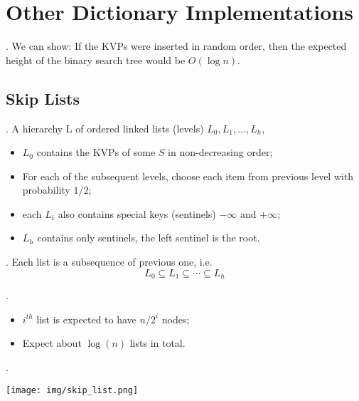 \documentclass{article}
\begin{document}
\newpage

\section{Other Dictionary Implementations} 

\begin{thmm}[].
    We can show: If the KVPs were inserted in random order, then the expected height of the binary search tree would be $O(\log n)$. 
\end{thmm}

\subsection{Skip Lists} 

\begin{deff}.
    A hierarchy L of ordered linked lists (levels) $L_0, L_1, \ldots, L_h$, 
    \begin{itemize}
        \item $L_0$ contains the KVPs of some $S$ in non-decreasing order; 
        \item For each of the subsequent levels, choose each item from previous level with probability $1/2$; 
        \item each $L_i$ also contains special keys (sentinels) $- \infty$ and $+ \infty$; 
        \item $L_h$ contains only sentinels, the left sentinel is the root.
    \end{itemize}
\end{deff}

\begin{discovery}[].
    Each list is a subsequence of previous one, i.e. 
    \[ L_0 \subseteq L_1 \subseteq \cdots \subseteq L_h \]
\end{discovery}

\begin{discovery}[].
    \begin{itemize}
        \item $i^{th}$ list is expected to have $n/2^i$ nodes; 
        \item Expect about $\log(n)$ lists in total. 
    \end{itemize}
\end{discovery}

\begin{examplee}[].
    \begin{center}
        \texttt{[image: img/skip\_list.png]}
    \end{center}
\end{examplee}
\end{document}
